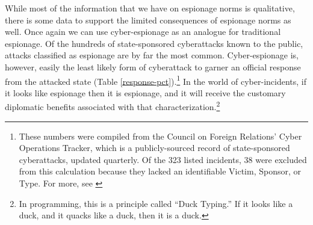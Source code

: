 \documentclass[14pt]{extarticle}
\begin{document}
While most of the information that we have on espionage norms is qualitative, there is some data to support the limited consequences of espionage norms as well. Once again we can use cyber-espionage as an analogue for traditional espionage. Of the hundreds of state-sponsored cyberattacks known to the public, attacks classified as espionage are by far the most common. Cyber-espionage is, however, easily the least likely form of cyberattack to garner an official response from the attacked state (Table \ref{response-pct}).\footnote{These numbers were compiled from the Council on Foreign Relations' Cyber Operations Tracker, which is a publicly-sourced record of state-sponsored cyberattacks, updated quarterly. Of the 323 listed incidents, 38 were excluded from this calculation because they lacked an identifiable Victim, Sponsor, or Type. For more, see \cite{council_on_foreign_relations_new_2019}} In the world of cyber-incidents, if it looks like espionage then it is espionage, and it will receive the customary diplomatic benefits associated with that characterization.\footnote{In programming, this is a principle called \enquote{Duck Typing.} If it looks like a duck, and it quacks like a duck, then it is a duck.}



\end{document}
